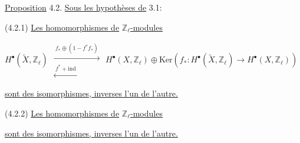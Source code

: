 \underline{Proposition} 4.2. \underline{Sous les hypothèses de} 3.1:

(4.2.1) \underline{Les homomorphismes de} $\mathbb{Z}_{\ell}$\underline{-modules}

\begin{equation*}
H^{\bullet}(\widetilde{X},\mathbb{Z}_{\ell}) \; \begin{array}{c} \xrightarrow{\;f_{*}\oplus(1-f^{*}f_{*})\;} \\ \xleftarrow{\;f^{*}+\mathrm{ind}\;} \end{array} \; H^{\bullet}(X,\mathbb{Z}_{\ell}) \oplus \mathrm{Ker}(f_{*}:H^{\bullet}(\widetilde{X},\mathbb{Z}_{\ell}) \longrightarrow H^{\bullet}(X,\mathbb{Z}_{\ell})) \quad 
\end{equation*}


 \underline{sont des isomorphismes, inverses l'un de l'autre.}

(4.2.2) \underline{Les homomorphismes de} $\mathbb{Z}_{\ell}$\underline{-modules}

\begin{center}
\end{center}
\underline{sont des isomorphismes, inverses l'un de l'autre.}

